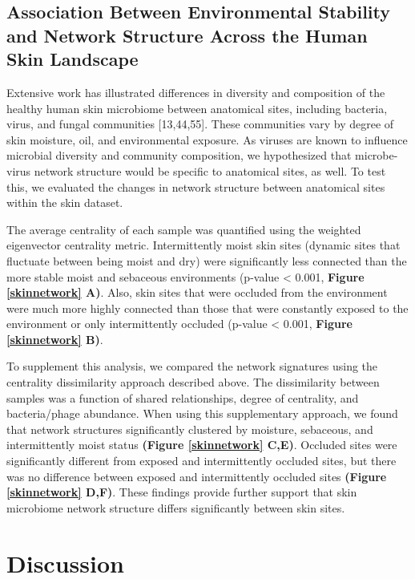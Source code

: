 \documentclass[12pt,]{article}
\begin{document}
\subsection{Association Between Environmental Stability and Network
Structure Across the Human Skin
Landscape}\label{association-between-environmental-stability-and-network-structure-across-the-human-skin-landscape}

Extensive work has illustrated differences in diversity and composition
of the healthy human skin microbiome between anatomical sites, including
bacteria, virus, and fungal communities {[}13,44,55{]}. These
communities vary by degree of skin moisture, oil, and environmental
exposure. As viruses are known to influence microbial diversity and
community composition, we hypothesized that microbe-virus network
structure would be specific to anatomical sites, as well. To test this,
we evaluated the changes in network structure between anatomical sites
within the skin dataset.

The average centrality of each sample was quantified using the weighted
eigenvector centrality metric. Intermittently moist skin sites (dynamic
sites that fluctuate between being moist and dry) were significantly
less connected than the more stable moist and sebaceous environments
(p-value \textless{} 0.001, \textbf{Figure \ref{skinnetwork} A)}. Also,
skin sites that were occluded from the environment were much more highly
connected than those that were constantly exposed to the environment or
only intermittently occluded (p-value \textless{} 0.001, \textbf{Figure
\ref{skinnetwork} B)}.

To supplement this analysis, we compared the network signatures using
the centrality dissimilarity approach described above. The dissimilarity
between samples was a function of shared relationships, degree of
centrality, and bacteria/phage abundance. When using this supplementary
approach, we found that network structures significantly clustered by
moisture, sebaceous, and intermittently moist status \textbf{(Figure
\ref{skinnetwork} C,E)}. Occluded sites were significantly different
from exposed and intermittently occluded sites, but there was no
difference between exposed and intermittently occluded sites
\textbf{(Figure \ref{skinnetwork} D,F)}. These findings provide further
support that skin microbiome network structure differs significantly
between skin sites.

\section{Discussion}\label{discussion}
\end{document}
